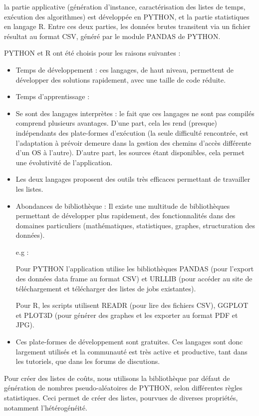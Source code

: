 \documentclass[a4paper,12pt]{report}
\theoremstyle{plain}				%
\theoremstyle{definition}				%
\begin{document}
\begin{appendices}
la partie applicative (génération d'instance, caractérisation des listes de temps, 
  exécution des algorithmes) est développée en PYTHON, et 
  la partie statistiques en langage R. 
Entre ces deux parties, les données brutes transitent via un fichier résultat au format CSV, 
 généré par le module PANDAS de PYTHON.
 
PYTHON et R ont été choisis pour les raisons suivantes :
\begin{itemize}
\item Temps de développement : ces langages, de haut niveau, permettent de développer 
  des solutions rapidement, avec une taille de code réduite.
\item Temps d'apprentissage : 
\item Se sont des langages interprètes : le fait que ces langages ne sont pas compilés 
  comprend plusieurs avantages. 
  D'une part, cela les rend (presque) indépendants des plate-formes d'exécution
  (la seule difficulté rencontrée, est l'adaptation à prévoir demeure dans la gestion des 
  chemins d'accès différente d'un OS à l'autre).
  D'autre part, les sources étant disponibles, cela permet une évolutivité de l’application. 
\item Les deux langages proposent des outils très efficaces permettant de travailler les listes.  
\item Abondances de bibliothèque : Il existe une multitude de bibliothèques permettant de 
  développer plus rapidement, 
  des fonctionnalités dans des domaines particuliers (mathématiques, statistiques, graphes, 
  structuration des données).

  e.g : 
  
  Pour PYTHON l'application utilise les bibliothèques 
  PANDAS (pour l'export des données data frame au format CSV) et 
  URLLIB (pour accéder au site de téléchargement et télécharger des listes de jobs existantes).

  Pour R, les scripts utilisent  
  READR (pour lire des fichiers CSV),  
  GGPLOT et PLOT3D (pour générer des graphes et les exporter au format PDF et JPG).
\item Ces plate-formes de développement sont gratuites. Ces langages sont donc largement utilisés 
  et la communauté est très active et productive,
  tant dans les tutoriels, 
  que dans les forums de discutions.         
\end{itemize}




\bigskip
Pour créer des listes de coûts, nous utilisons la bibliothèque par défaut de génération de 
  nombres pseudo-aléatoires de PYTHON, selon différentes règles statistiques. 
Ceci permet de créer des listes, pourvues de diverses propriétés, notamment l’hétérogénéité. 


\end{appendices}
\end{document}
